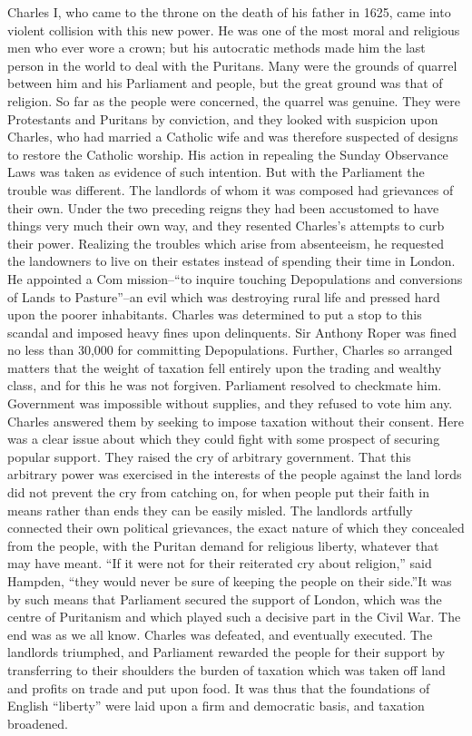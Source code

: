 \documentclass{book}
\begin{document}
Charles I, who came to the throne on the death of his father in 1625, came into violent collision with this new power. He was one of the most moral and religious men who ever wore a crown; but his autocratic methods made him the last person in the world to deal with the Puritans. Many were the grounds of quarrel between him and his Parliament and people, but the great ground was that of religion. So far as the people were concerned, the quarrel was genuine. They were Protestants and Puritans by conviction, and they looked with suspicion upon Charles, who had married a Catholic wife and was therefore suspected of designs to restore the Catholic worship. His action in repealing the Sunday Observance Laws was taken as evidence of such intention. But with the Parliament the trouble was different. The landlords of whom it was composed had grievances of their own. Under the two preceding reigns they had been accustomed to have things very much their own way, and they resented Charles’s attempts to curb their power. Realizing the troubles which arise from absenteeism, he requested the landowners to live on their estates instead of spending their time in London. He appointed a Com mission–“to inquire touching Depopulations and conversions of Lands to Pasture”–an evil which was destroying rural life and pressed hard upon the poorer inhabitants. Charles was determined to put a stop to this scandal and imposed heavy fines upon delinquents. Sir Anthony Roper was fined no less than 30,000 for committing Depopulations. Further, Charles so arranged matters that the weight of taxation fell entirely upon the trading and wealthy class, and for this he was not forgiven. Parliament resolved to checkmate him. Government was impossible without supplies, and they refused to vote him any. Charles answered them by seeking to impose taxation without their consent. Here was a clear issue about which they could fight with some prospect of securing popular support. They raised the cry of arbitrary government. That this arbitrary power was exercised in the interests of the people against the land lords did not prevent the cry from catching on, for when people put their faith in means rather than ends they can be easily misled. The landlords artfully connected their own political grievances, the exact nature of which they concealed from the people, with the Puritan demand for religious liberty, whatever that may have meant. “If it were not for their reiterated cry about religion,” said Hampden, “they would never be sure of keeping the people on their side.”\footnotemark[6] It was by such means that Parliament secured the support of London, which was the centre of Puritanism and which played such a decisive part in the Civil War. The end was as we all know. Charles was defeated, and eventually executed. The landlords triumphed, and Parliament rewarded the people for their support by transferring to their shoulders the burden of taxation which was taken off land and profits on trade and put upon food. It was thus that the foundations of English “liberty” were laid upon a firm and democratic basis, and taxation broadened.
\end{document}
